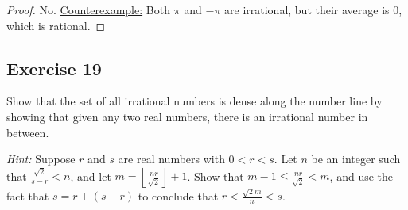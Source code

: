 \documentclass[14pt]{extarticle}
\newcommand{\dps}{\displaystyle}
\newcommand{\floor}[1]{{\left\lfloor#1\right\rfloor}}
\begin{document}
\begin{proof}
    No. \underline{Counterexample:} Both \(\pi\) and \(-\pi\) are irrational, but their average is 0, which is rational.
\end{proof}

\subsection{Exercise 19}
Show that the set of all irrational numbers is dense along the number line by showing that given any two real numbers, there is an irrational number in between.

    {\it Hint:} Suppose $r$ and $s$ are real numbers with \(0 < r < s\). Let $n$ be an integer such that \(\dps \frac
{\sqrt{2}}{s-r} < n\), and let \(\dps m = \floor {\frac{nr}{\sqrt{2}}} + 1\). Show that \(\dps m-1 \leq \frac{nr}
{\sqrt{2}} < m\), and use the fact that \(s = r + (s-r)\) to conclude that \(\dps r < \frac{\sqrt{2}m}{n} < s\).
\end{document}
